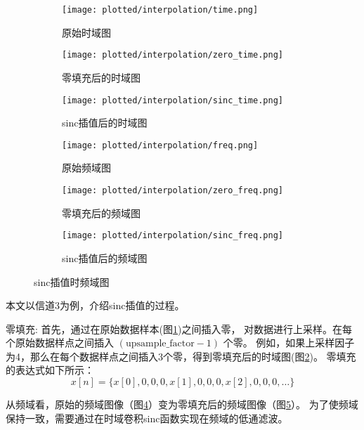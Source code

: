 \begin{figure}[htbp]
    \centering
    \begin{subfigure}{0.33\textwidth}
        \centering
        \texttt{[image: plotted/interpolation/time.png]}
        \caption{\label{fig:time}原始时域图}
    \end{subfigure}%
    \begin{subfigure}{0.33\textwidth}
        \centering
        \texttt{[image: plotted/interpolation/zero\_time.png]}
        \caption{\label{fig:zero_time}零填充后的时域图}
    \end{subfigure}
    \begin{subfigure}{0.33\textwidth}
        \centering
        \texttt{[image: plotted/interpolation/sinc\_time.png]}
        \caption{\label{fig:sinc_time}sinc插值后的时域图}
    \end{subfigure}

    \begin{subfigure}{0.33\textwidth}
        \centering
        \texttt{[image: plotted/interpolation/freq.png]}
        \caption{\label{fig:freq}原始频域图}
    \end{subfigure}%
    \begin{subfigure}{0.33\textwidth}
        \centering
        \texttt{[image: plotted/interpolation/zero\_freq.png]}
        \caption{\label{fig:zero_freq}零填充后的频域图}
    \end{subfigure}
    \begin{subfigure}{0.33\textwidth}
        \centering
        \texttt{[image: plotted/interpolation/sinc\_freq.png]}
        \caption{\label{fig:sinc_freq}sinc插值后的频域图}
    \end{subfigure}
    \caption{sinc插值时频域图}
    \label{fig:interpolation}
\end{figure}

本文以信道3为例，介绍sinc插值的过程。

零填充:
首先，通过在原始数据样本(图\ref{fig:time})之间插入零，
对数据进行上采样。在每个原始数据样点之间插入 \( ( \text{upsample\_factor} - 1) \) 个零。
例如，如果上采样因子为4，那么在每个数据样点之间插入3个零，得到零填充后的时域图(图\ref{fig:zero_time})。
零填充的表达式如下所示：
\[
    x[n] = \{x[0], 0, 0, 0, x[1], 0, 0, 0, x[2], 0, 0, 0, \ldots\}
\]

从频域看，原始的频域图像（图\ref{fig:freq}）变为零填充后的频域图像（图\ref{fig:zero_freq}）。
为了使频域保持一致，需要通过在时域卷积sinc函数实现在频域的低通滤波。

